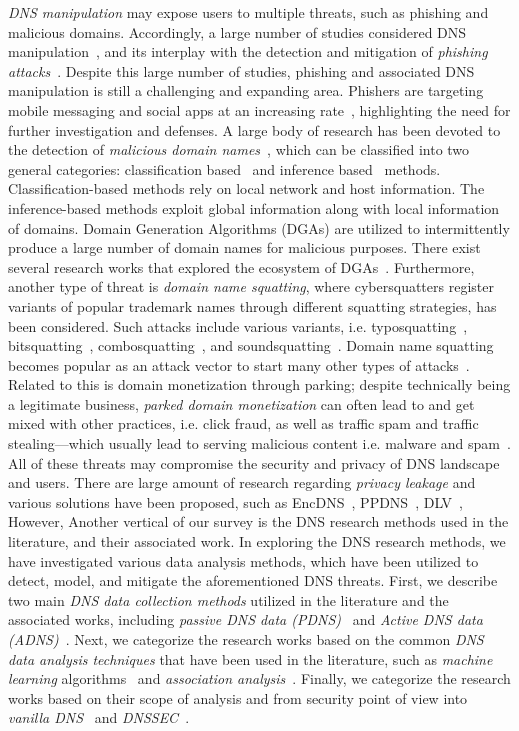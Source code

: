 \textit{DNS manipulation} may expose users to multiple threats, such as phishing and malicious domains. Accordingly, a large number of studies considered DNS manipulation~, and its interplay with the detection and mitigation of \textit{phishing attacks}~. Despite this large number of studies, phishing and associated DNS manipulation is still a challenging and expanding area.  Phishers are targeting mobile messaging and social apps at an increasing rate~, highlighting the need for further investigation and defenses. 
A large body of research has been devoted to the detection of \textit{malicious domain names}~, which can be classified into two general categories: classification based~ and inference based~ methods. Classification-based methods rely on local network and host information. The inference-based methods exploit global information along with local information of domains. 
Domain Generation Algorithms (DGAs) are utilized to intermittently produce a large number of domain names for malicious purposes. There exist several research works that explored the ecosystem of DGAs~. 
Furthermore, another type of threat is \textit{domain name squatting}, where cybersquatters register variants of popular trademark names through different squatting strategies, has been considered. Such attacks include various variants, i.e. typosquatting~, bitsquatting~, combosquatting~, and soundsquatting~. Domain name squatting becomes popular as an attack vector to start many other types of attacks~. Related to this is domain monetization through parking; despite technically being a legitimate business, \textit{parked domain monetization} can often lead to and get mixed with other practices, i.e. click fraud, as well as traffic spam and traffic stealing---which usually lead to serving  malicious content i.e. malware and  spam~. All of these threats may compromise the security and privacy of DNS landscape and users. There are large amount of research regarding \textit{privacy leakage} and various solutions have been proposed, such as  EncDNS~, PPDNS~, DLV~, \etc However, 
 Another vertical of our survey is the DNS research methods used in the literature, and their associated work. In exploring the DNS research methods, we have investigated various data analysis methods, which have been utilized to detect, model, and mitigate the aforementioned DNS threats. First, we describe two main \textit{DNS data collection methods} utilized in the literature and the associated works, including \textit{passive DNS data (PDNS)}~ and \textit{Active DNS data (ADNS)}~.  Next, we categorize the research works based on the common \textit{DNS data analysis techniques} that have been used in the literature, such as\textit{ machine learning} algorithms~ and \textit{association analysis}~. Finally, we categorize the research works based on their scope of analysis and from security point of view into \textit{vanilla DNS}~ and \textit{DNSSEC}~.

